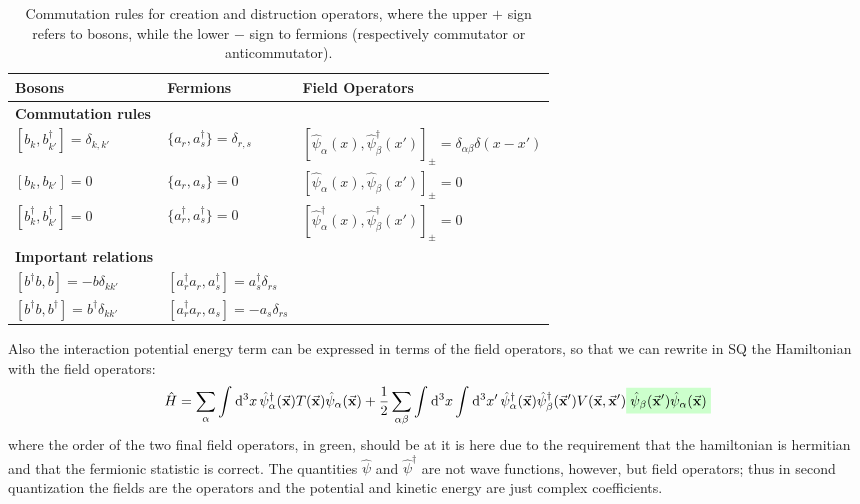 \documentclass[../main/main.tex]{subfiles}
\begin{document}
\begin{table}[h!]
  \centering
\begin{tabular}{lll}
  \toprule
  \textbf{Bosons}  & \textbf{Fermions} & \textbf{Field Operators} \\
  \toprule
  \textbf{Commutation rules} & & \\
  \midrule
   \( [b_k,b_{k'}^\dag ] = \delta _{k,k'} \) & \( \{a_r,a_{s}^\dag \} = \delta _{r,s} \)&  \( [\hat{\psi }_ \alpha (x), \hat{\psi }_ \beta ^\dag (x')  ]_\pm = \delta _{\alpha \beta } \delta (x-x') \) \\
   \( [b_k,b_{k'}] = 0 \) & \( \{ a_r,a_s \}=0   \)& \( [\hat{\psi }_ \alpha (x), \hat{\psi }_ \beta (x')  ]_\pm = 0 \)\\
   \( [b_k ^\dag , b_{k'} ^\dag ] = 0 \) & \( \{ a_r ^\dag , a_s ^\dag  \} =0  \) & \( [\hat{\psi }_ \alpha ^\dag (x), \hat{\psi }_ \beta ^\dag (x')  ]_\pm = 0 \) \\
   \midrule
   \textbf{Important relations} & & \\
   \midrule
   \( [b ^\dag b, b] = - b \delta _{kk'} \) & \( [a_r ^\dag  a_r, a_s ^\dag ] = a_s ^\dag \delta _{rs} \)& \\
   \( [b ^\dag b , b ^\dag ] = b ^\dag \delta _{k k'} \) & \( [a_r ^\dag  a_r, a_s] = - a_s \delta _{rs} \)& \\
   \bottomrule
\end{tabular}
\caption{Commutation rules for creation and distruction operators, where the upper \( + \) sign refers to bosons, while the lower  \( - \) sign to fermions (respectively commutator or anticommutator).}
\end{table}



Also the interaction potential energy term can be expressed in terms of the field operators, so that we can rewrite in SQ the Hamiltonian with the field operators:
\begin{equation}
  \hat{H} = \sum_{\alpha }^{} \int_{}^{} \dd[3]{x} \hat{\psi }_ \alpha ^\dag  (\va{x}) T (\va{x}) \hat{\psi }_ \alpha (\va{x})
  + \frac{1}{2} \sum_{\alpha \beta }^{} \int_{}^{} \dd[3]{x}
  \int_{}^{} \dd[3]{x'} \hat{\psi }_ \alpha ^\dag (\va{x})
  \hat{\psi }_ \beta ^\dag (\va{x}') V (\va{x},\va{x}') \mathcolorbox{green!20}{\hat{\psi }_ \beta (\va{x}') \hat{\psi }_ \alpha (\va{x})          }
\end{equation}
where the order of the two final field operators, in green, should be at it is here due to the requirement that the hamiltonian is hermitian and that the fermionic statistic is correct.
The quantities \( \hat{\psi }  \) and \( \hat{\psi } ^\dag   \) are not wave functions, however, but field operators; thus in second quantization the fields are the operators and the potential and kinetic energy are just complex coefficients.
\end{document}
